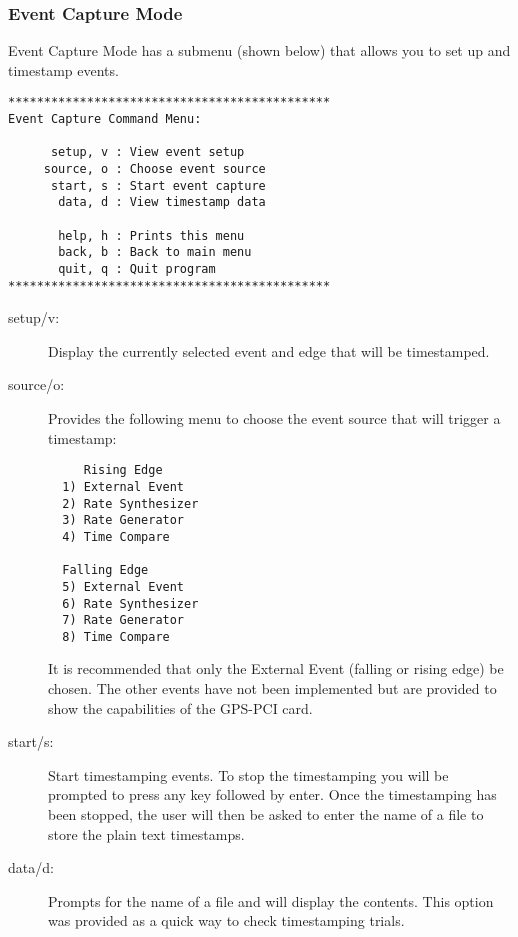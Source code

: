 \documentclass[11pt]{article}
\begin{document}
\subsubsection{Event Capture Mode} \label{eventcap}
Event Capture Mode has a submenu (shown below) that allows you to set up and timestamp events.
\begin{verbatim}
*********************************************
Event Capture Command Menu:

      setup, v : View event setup
     source, o : Choose event source
      start, s : Start event capture
       data, d : View timestamp data

       help, h : Prints this menu
       back, b : Back to main menu
       quit, q : Quit program
*********************************************
\end{verbatim}
\begin{description}
 \item [setup/v:] Display the currently selected event and edge that will be timestamped.
 \item [source/o:] Provides the following menu to choose the event source that will trigger a timestamp:
  \begin{verbatim}
     Rising Edge
  1) External Event
  2) Rate Synthesizer
  3) Rate Generator
  4) Time Compare

  Falling Edge
  5) External Event
  6) Rate Synthesizer
  7) Rate Generator
  8) Time Compare

  \end{verbatim}
It is recommended that only the External Event (falling or rising edge) be chosen.  The other events have not been implemented but are provided to show the capabilities of the GPS-PCI card.
 \item [start/s:] Start timestamping events.  To stop the timestamping you will be prompted to press any key followed by enter.  Once the timestamping has been stopped, the user will then be asked to enter the name of a file to store the plain text timestamps.
 \item [data/d:] Prompts for the name of a file and will display the contents. This option was provided as a quick way to check timestamping trials.
\end{description}
\end{document}
